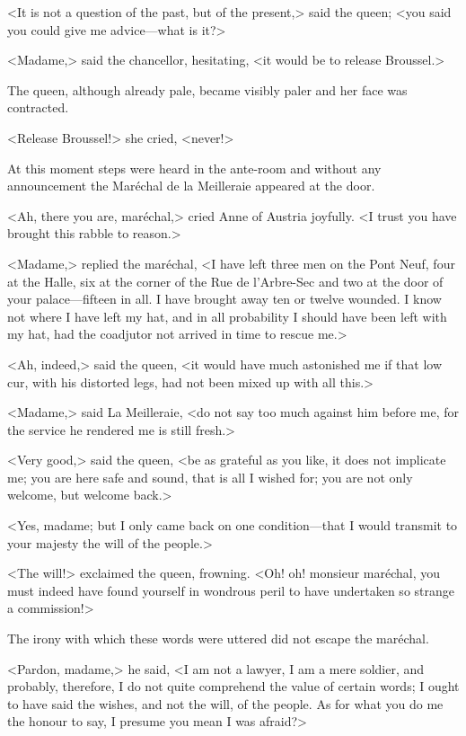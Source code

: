 <It is not a question of the past, but of the present,> said the queen; <you said you could give me advice—what is it?>

<Madame,> said the chancellor, hesitating, <it would be to release Broussel.>

The queen, although already pale, became visibly paler and her face was contracted.

<Release Broussel!> she cried, <never!>

At this moment steps were heard in the ante-room and without any announcement the Maréchal de la Meilleraie appeared at the door.

<Ah, there you are, maréchal,> cried Anne of Austria joyfully. <I trust you have brought this rabble to reason.>

<Madame,> replied the maréchal, <I have left three men on the Pont Neuf, four at the Halle, six at the corner of the Rue de l'Arbre-Sec and two at the door of your palace—fifteen in all. I have brought away ten or twelve wounded. I know not where I have left my hat, and in all probability I should have been left with my hat, had the coadjutor not arrived in time to rescue me.>

<Ah, indeed,> said the queen, <it would have much astonished me if that low cur, with his distorted legs, had not been mixed up with all this.>

<Madame,> said La Meilleraie, <do not say too much against him before me, for the service he rendered me is still fresh.>

<Very good,> said the queen, <be as grateful as you like, it does not implicate me; you are here safe and sound, that is all I wished for; you are not only welcome, but welcome back.>

<Yes, madame; but I only came back on one condition—that I would transmit to your majesty the will of the people.>

<The will!> exclaimed the queen, frowning. <Oh! oh! monsieur maréchal, you must indeed have found yourself in wondrous peril to have undertaken so strange a commission!>

The irony with which these words were uttered did not escape the maréchal.

<Pardon, madame,> he said, <I am not a lawyer, I am a mere soldier, and probably, therefore, I do not quite comprehend the value of certain words; I ought to have said the wishes, and not the will, of the people. As for what you do me the honour to say, I presume you mean I was afraid?>

